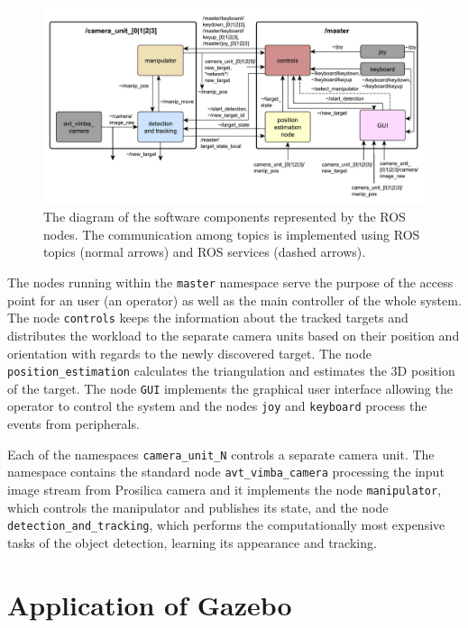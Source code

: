 \begin{figure}[htb]
	\centering
	\includegraphics[width=14.5cm]{fig/sw_ols.pdf}
	\caption{The diagram of the software components represented by the ROS nodes. The communication among topics is implemented using ROS topics (normal arrows) and ROS services (dashed arrows).}
	\label{fig:sw_ols}
\end{figure}

The nodes running within the \texttt{master} namespace serve the purpose of the access point for an user (an operator) as well as the main controller of the whole system. The node \texttt{controls} keeps the information about the tracked targets and distributes the workload to the separate camera units based on their position and orientation with regards to the newly discovered target. The node \texttt{position\_estimation} calculates the triangulation and estimates the 3D position of the target. The node \texttt{GUI} implements the graphical user interface allowing the operator to control the system and the nodes \texttt{joy} and \texttt{keyboard} process the events from peripherals.

Each of the namespaces \texttt{camera\_unit\_N} controls a separate camera unit. The namespace contains the standard node \texttt{avt\_vimba\_camera} processing the input image stream from Prosilica camera and it implements the node \texttt{manipulator}, which controls the manipulator and publishes its state, and the node \texttt{detection\_and\_tracking}, which performs the computationally most expensive tasks of the object detection, learning its appearance and tracking.


\section{Application of Gazebo} \label{txt:application_of_gazebo}

